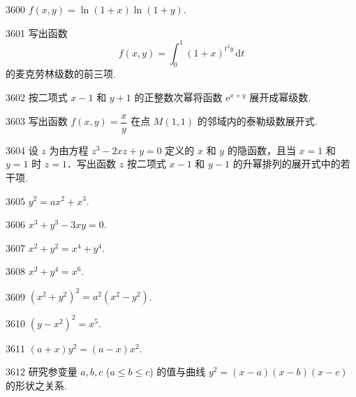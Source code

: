 \begin{prob}[S]{3600}
$f(x, y) = \ln(1 + x)\ln(1 + y)$.
\end{prob}

\begin{prob}[M]{3601}
写出函数
\[
f(x, y) = \int_{0}^{1} (1 + x)^{t^2 y}\,\mathrm{d}t
\]
的麦克劳林级数的前三项.
\end{prob}

\begin{prob}[M]{3602}
按二项式 $x - 1$ 和 $y + 1$ 的正整数次幂将函数 $\mathrm{e}^{x + y}$ 展开成幂级数.
\end{prob}

\begin{prob}[M]{3603}
写出函数 $f(x, y) = \dfrac{x}{y}$ 在点 $M(1, 1)$ 的邻域内的泰勒级数展开式.
\end{prob}

\begin{prob}[M]{3604}
设 $z$ 为由方程 $z^3 - 2xz + y = 0$ 定义的 $x$ 和 $y$ 的隐函数，且当 $x = 1$ 和 $y = 1$ 时 $z = 1$．写出函数 $z$ 按二项式 $x - 1$ 和 $y - 1$ 的升幂排列的展开式中的若干项.
\end{prob}


\begin{prob}[S]{3605}
$y^2 = ax^2 + x^3$.
\end{prob}

\begin{prob}[S]{3606}
$x^3 + y^3 - 3xy = 0$.
\end{prob}

\begin{prob}[S]{3607}
$x^2 + y^2 = x^4 + y^4$.
\end{prob}

\begin{prob}[S]{3608}
$x^2 + y^4 = x^6$.
\end{prob}

\begin{prob}[S]{3609}
$(x^2 + y^2)^2 = a^2(x^2 - y^2)$.
\end{prob}

\begin{prob}[S]{3610}
$(y - x^2)^2 = x^5$.
\end{prob}

\begin{prob}[S]{3611}
$(a + x)y^2 = (a - x)x^2$.
\end{prob}

\begin{prob}[M]{3612}
研究参变量 $a, b, c$ ($a \leqslant b \leqslant c$) 的值与曲线 $y^2 = (x - a)(x - b)(x - c)$ 的形状之关系.
\end{prob}


